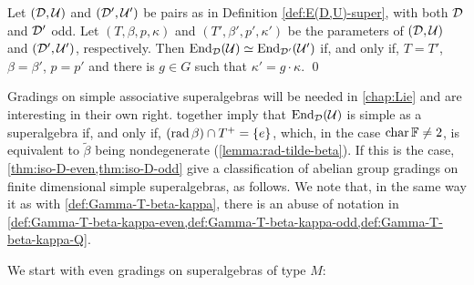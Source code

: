 \begin{thm}\label{thm:iso-D-odd}
    Let $(\mathcal{D}, \mathcal U)$ and $(\mathcal{D}', \mathcal U')$ be pairs as in Definition \ref{def:E(D,U)-super}, with both $\mathcal{D}$ and $\mathcal{D}'$ odd. 
    Let $(T, \beta, p, \kappa)$ and $(T', \beta', p', \kappa')$ be the parameters of $(\mathcal{D}, \mathcal U)$ and $(\mathcal{D}', \mathcal U')$, respectively. 
	Then $\operatorname{End}_{\mathcal{D}} (\mathcal U) \simeq \operatorname{End}_{\mathcal{D}'} (\mathcal U')$ if, and only if, $T=T'$, $\beta=\beta'$, $p = p'$ and there is $g\in G$ such that $\kappa' = g \cdot \kappa$. \qed
\end{thm}

Gradings on simple associative superalgebras will be needed in \cref{chap:Lie} and are interesting in their own right. 
 together imply that $\operatorname{End}_{\mathcal{D}} (\mathcal U)$ is simple as a superalgebra if, and only if, $(\operatorname{rad} \beta) \cap T^+ = \{e\}$, which, in the case $\operatorname{char} \mathbb{F} \neq 2$, is equivalent to $\tilde\beta$ being nondegenerate (\cref{lemma:rad-tilde-beta}). 
If this is the case,  \cref{thm:iso-D-even,thm:iso-D-odd} give a classification of abelian group gradings on finite dimensional simple superalgebras, as follows. 
We note that, in the same way it as with  \cref{def:Gamma-T-beta-kappa}, there is an abuse of notation in \cref{def:Gamma-T-beta-kappa-even,def:Gamma-T-beta-kappa-odd,def:Gamma-T-beta-kappa-Q}. 



We start with even gradings on superalgebras of type $M$:

